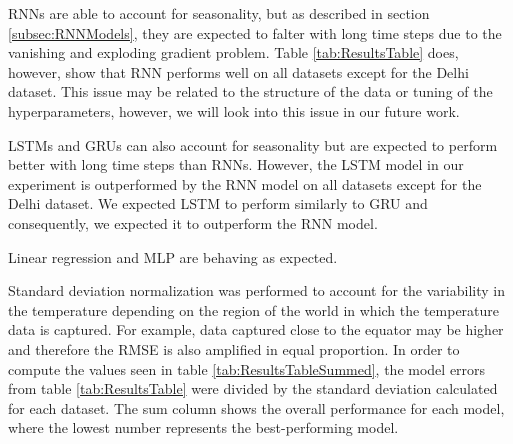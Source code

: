 RNNs are able to account for seasonality, but as described in section \ref{subsec:RNNModels}, they are expected to falter with long time steps due to the vanishing and exploding gradient problem. Table \ref{tab:ResultsTable} does, however, show that RNN performs well on all datasets except for the Delhi dataset. This issue may be related to the structure of the data or tuning of the hyperparameters, however, we will look into this issue in our future work.

LSTMs and GRUs can also account for seasonality but are expected to perform better with long time steps than RNNs. 
However, the LSTM model in our experiment is outperformed by the RNN model on all datasets except for the Delhi dataset.
We expected LSTM to perform similarly to GRU and consequently, we expected it to outperform the RNN model.

Linear regression and MLP are behaving as expected.

Standard deviation normalization was performed to account for the variability in the temperature depending on the region of the world in which the temperature data is captured. 
For example, data captured close to the equator may be higher and therefore the RMSE is also amplified in equal proportion. 
In order to compute the values seen in table \ref{tab:ResultsTableSummed}, the model errors from table \ref{tab:ResultsTable} were divided by the standard deviation calculated for each dataset.
The sum column shows the overall performance for each model, where the lowest number represents the best-performing model. 